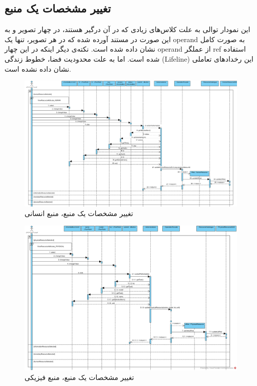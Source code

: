 \begin{landscape}
\section{تغییر مشخصات یک منبع}
این نمودار توالی به علت کلاس‌های زیادی که در آن درگیر هستند، در چهار تصویر و به این صورت در مستند آورده شده که در هر تصویر، تنها یک operand به صورت کامل نشان داده شده است. نکته‌ی دیگر اینکه در این چهار operand از عملگر ref استفاده شده است. اما به علت محدودیت فضا، خطوط زندگی (Lifeline) این رخدادهای تعاملی نشان داده نشده است.
\begin{figure}[H]
	\centering
	\includegraphics[scale=0.5]{img/sequence-design/EditResourceAttributes_HUMAN}
	\caption{تغییر مشخصات یک منبع، منبع انسانی}
\end{figure}
\begin{figure}[H]
	\centering
	\includegraphics[scale=0.6]{img/sequence-design/EditResourceAttributes_PHYSICAL}
	\caption{تغییر مشخصات یک منبع، منبع فیزیکی}

\end{figure}
\end{landscape}
